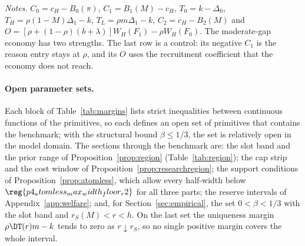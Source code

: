 \begin{table}[ht]
\begin{tabular}{@{}lrrrrrrrc@{}}
\bottomrule
\end{tabular}
\par\medskip
\begin{minipage}{0.95\linewidth}\footnotesize
\textit{Notes.} \(C_0=c_H-B_0(\pi)\), \(C_1=B_1(M)-c_H\), \(T_0=k-\Delta_0\), \(T_H=\rho(1-M)\Delta_1-k\),
\(T_L=\rho m\Delta_1-k\), \(C_2=c_H-B_2(M)\) and \(O=[\rho+(1-\rho)(b+\lambda)]W_H(F_1)-\rho W_H(F_0)\). The moderate-gap
economy has two strengths. The last row is a control: its negative \(C_1\) is the reason entry stays at \(\rho\), and
its \(O\) uses the recruitment coefficient that the economy does not reach.
\end{minipage}
\end{table}

\paragraph{Open parameter sets.}
Each block of Table~\ref{tab:margins} lists strict inequalities between continuous functions of the primitives, so
each defines an open set of primitives that contains the benchmark; with the structural bound \(\beta\le1/3\), the set
is relatively open in the model domain. The sections through the benchmark are: the slot band and the prior range of
Proposition~\ref{prop:region} (Table~\ref{tab:region}); the cap strip and the cost window of
Proposition~\ref{prop:researchregion}; the support conditions of Proposition~\ref{prop:atomless}, which allow every
half-width below \(\reg{p4_atomless_max_width_floor_r2}\) for all three parts; the reserve intervals of
Appendix~\ref{app:welfare}; and, for Section~\ref{sec:empirical}, the set \(0<\beta<1/3\) with the slot band and
\(r_S(M)<r<h\). On the last set the uniqueness margin \(\rho\DT(r)m-k\) tends to zero as \(r\downarrow r_S\), so no
single positive margin covers the whole interval.
